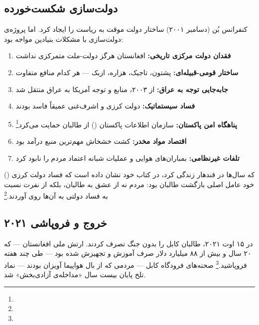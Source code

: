 \subsection{دولت‌سازی شکست‌خورده}
\label{subsec:ch10-afghan-statebuilding}

کنفرانس بُن (دسامبر ۲۰۰۱) ساختار دولت موقت به ریاست  را ایجاد کرد. اما پروژه‌ی دولت‌سازی با مشکلات بنیادین مواجه بود:

\begin{tcolorbox}[failbox, title={عوامل شکست: دولت‌سازی در افغانستان}]
\begin{enumerate}
\item \textbf{فقدان دولت مرکزی تاریخی:} افغانستان هرگز دولت-ملت متمرکزی نداشت
\item \textbf{ساختار قومی-قبیله‌ای:} پشتون، تاجیک، هزاره، ازبک — هر کدام منافع متفاوت
\item \textbf{جابه‌جایی توجه به عراق:} از ۲۰۰۳، منابع و توجه آمریکا به عراق منتقل شد
\item \textbf{فساد سیستماتیک:} دولت کرزی و اشرف‌غنی عمیقاً فاسد بودند
\item \textbf{پناهگاه امن پاکستان:} سازمان اطلاعات پاکستان () از طالبان حمایت می‌کرد\footnote{}
\item \textbf{اقتصاد مواد مخدر:} کشت خشخاش مهم‌ترین منبع درآمد بود
\item \textbf{تلفات غیرنظامی:} بمباران‌های هوایی و عملیات شبانه اعتماد مردم را نابود کرد
\end{enumerate}
\end{tcolorbox}

 () که سال‌ها در قندهار زندگی کرد، در کتاب خود نشان داده است که فساد دولت کرزی خود عامل اصلی بازگشت طالبان بود: مردم نه از عشق به طالبان، بلکه از نفرت نسبت به فساد دولتی به آن‌ها روی آوردند.\footnote{}

\subsection{خروج و فروپاشی ۲۰۲۱}
\label{subsec:ch10-afghan-withdrawal}

در ۱۵ اوت ۲۰۲۱، طالبان کابل را بدون جنگ تصرف کردند. ارتش ملی افغانستان — که ۲۰ سال و بیش از ۸۸ میلیارد دلار صرف آموزش و تجهیزش شده بود — طی چند هفته فروپاشید.\footnote{} صحنه‌های فرودگاه کابل — مردمی که از بال هواپیما آویزان بودند — نماد تلخ پایان بیست سال «مداخله‌ی آزادی‌بخش» شد.

